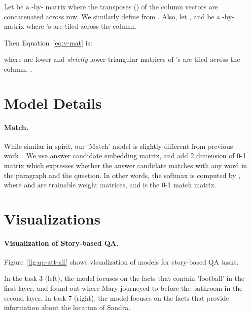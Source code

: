 \documentclass[table]{article}
\begin{document}
Let  
be a -by- matrix where the transposes () of the column vectors  are concatenated across row.
We similarly define  from . 
Also, let , and  be a -by- matrix where  's are tiled across the column.

Then Equation~\ref{eq:v-mat} is: 



where  are lower and \emph{strictly} lower triangular matrices of 's are tiled across the column. . 
 
\section{Model Details}\label{sec:app-d}

\paragraph{Match.}
While similar in spirit, our `Match' model is slightly different from previous work~\citep{bordes2016learning, perez2016gated}. 
We use answer candidate embedding matrix, and add 2 dimension of 0-1 matrix which expresses whether the answer candidate matches with any word in the paragraph and the question. In other words, the softmax is computed by
, where  and  are trainable weight matrices, and  is the 0-1 match matrix.


 
\section{Visualizations}\label{sec:app-c}


\paragraph{Visualization of Story-based QA.}
Figure~\ref{fig:qa-att-all} shows visualization of models for story-based QA tasks.

In the task 3 (left), the model focuses on the facts that contain 'football' in the first layer, and found out where Mary journeyed to before the bathroom in the second layer. In task 7 (right), the model focuses on the facts that provide information about  the location of Sandra.
\end{document}
